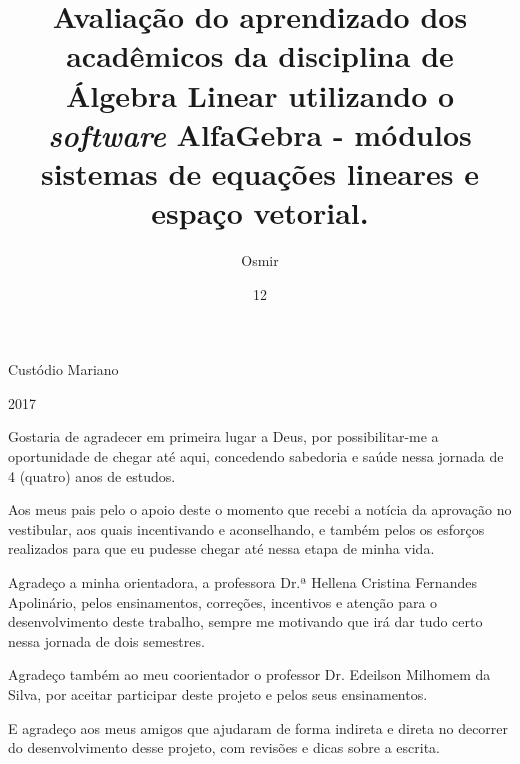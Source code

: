 \documentclass[tcc1]{uftex}
\begin{document}
  \title{Avaliação do aprendizado dos acadêmicos da disciplina de Álgebra Linear utilizando o \textit{software} AlfaGebra - módulos sistemas de equações lineares e espaço vetorial.}
  \author{Osmir}{Custódio Mariano}
  
  
  \begin{comment}
  \examiner{Prof.}{Nome do Primeiro Examinador Sobrenome}{D.Sc.}
  \examiner{Prof.}{Nome do Segundo Examinador Sobrenome}{Ph.D.}
  \examiner{Prof.}{Nome do Terceiro Examinador Sobrenome}{D.Sc.}
  \end{comment}
  
  \date{12}{2017}



  \maketitle

 \frontmatter
 \dedication{Dedico este trabalho aos meus pais, Orlando Mariano da Silva e Maria Gorete Ramos Custódio, que não mediram esforços para que eu chegasse até aqui.}

  \begin{acknowledgement}
  Gostaria de agradecer em primeira lugar a Deus, por possibilitar-me a oportunidade de chegar até aqui, concedendo sabedoria e saúde nessa jornada de 4 (quatro) anos de estudos.
  
  Aos meus pais pelo o apoio deste o momento que recebi a notícia da aprovação no vestibular, aos quais incentivando e aconselhando, e também pelos os esforços realizados para que eu pudesse chegar até nessa etapa de minha vida.
  
  Agradeço a minha orientadora, a professora Dr.ª Hellena Cristina Fernandes Apolinário, pelos ensinamentos, correções, incentivos e atenção para o desenvolvimento deste trabalho, sempre me motivando que irá dar tudo certo nessa jornada de dois semestres.
  
  Agradeço também ao meu coorientador o professor Dr. Edeilson Milhomem da Silva, por aceitar participar deste projeto e pelos seus ensinamentos.
  
  E agradeço aos meus amigos que ajudaram de forma indireta e direta no decorrer do desenvolvimento desse projeto, com revisões e dicas sobre a escrita.
  
  \end{acknowledgement}
\end{document}
